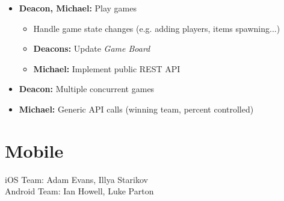 \documentclass[oneside,12pt]{scrbook}
\begin{document}
\begin{itemize}
\begin{itemize}
            \item Game clock
        \end{itemize}
    \item \textbf{Deacon, Michael:} Play games
        \begin{itemize}
            \item Handle game state changes (e.g. adding players, items spawning...)
            \item \textbf{Deacons:} Update \emph{Game Board}
            \item \textbf{Michael:} Implement public REST API
        \end{itemize}
    \item \textbf{Deacon:} Multiple concurrent games
    \item \textbf{Michael:} Generic API calls (winning team, percent controlled)
\end{itemize}

\chapter{Mobile}
iOS Team: Adam Evans, Illya Starikov\\
Android Team: Ian Howell, Luke Parton
\end{document}

